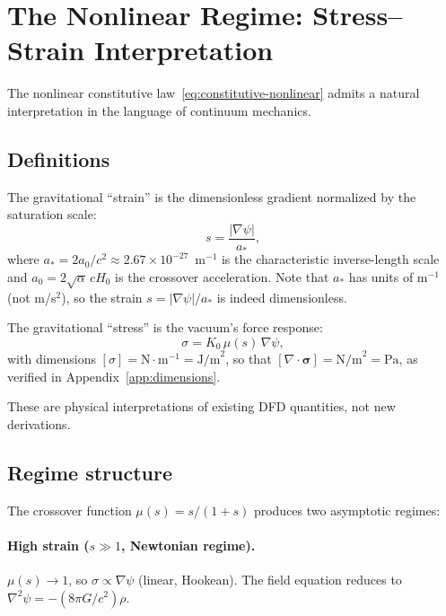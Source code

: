 \documentclass[aps,prd,twocolumn,superscriptaddress,nofootinbib]{revtex4-2}
\begin{document}
\section{The Nonlinear Regime: Stress--Strain Interpretation}
\label{sec:nonlinear}

The nonlinear constitutive law~\eqref{eq:constitutive-nonlinear}
admits a natural interpretation in the language of continuum mechanics.

\subsection{Definitions}

The gravitational ``strain'' is the dimensionless gradient normalized
by the saturation scale:
\begin{equation}
s = \frac{|\nabla\psi|}{a_*},
\label{eq:strain}
\end{equation}
where $a_* = 2a_0/c^2 \approx 2.67 \times 10^{-27}$~m$^{-1}$ is the
characteristic inverse-length scale and
$a_0 = 2\sqrt{\alpha}\,cH_0$ is the crossover acceleration.
Note that $a_*$ has units of m$^{-1}$ (not m/s$^2$), so the strain
$s = |\nabla\psi|/a_*$ is indeed dimensionless.

The gravitational ``stress'' is the vacuum's force response:
\begin{equation}
\sigma = K_0\,\mu(s)\,\nabla\psi,
\label{eq:stress}
\end{equation}
with dimensions $[\sigma] = \text{N}\cdot\text{m}^{-1}
= \text{J/m}^2$, so that
$[\nabla\cdot\bm{\sigma}] = \text{N/m}^2 = \text{Pa}$,
as verified in Appendix~\ref{app:dimensions}.

These are physical interpretations of existing DFD quantities, not new
derivations.

\subsection{Regime structure}

The crossover function $\mu(s) = s/(1+s)$ produces two asymptotic
regimes:

\paragraph{High strain ($s \gg 1$, Newtonian regime).}
$\mu(s) \to 1$, so $\sigma \propto \nabla\psi$ (linear, Hookean).
The field equation reduces to $\nabla^2\psi = -(8\pi G/c^2)\rho$.
\end{document}
